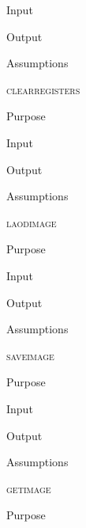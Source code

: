 \documentclass[pdftex, 11pt]{article}
\begin{document}
\begin{description}
\begin{description}
			\item{Input}


			\item{Output}


			\item{Assumptions}


		\end{description}



	\item{\textsc{clearregisters}}
		\begin{description}
			\item{Purpose}


			\item{Input}


			\item{Output}


			\item{Assumptions}


		\end{description}



	\item{\textsc{laodimage}}
		\begin{description}
			\item{Purpose}


			\item{Input}


			\item{Output}


			\item{Assumptions}


		\end{description}



	\item{\textsc{saveimage}}
		\begin{description}
			\item{Purpose}


			\item{Input}


			\item{Output}


			\item{Assumptions}


		\end{description}



	\item{\textsc{getimage}}
		\begin{description}
			\item{Purpose}



\end{description}
\end{description}
\end{document}

